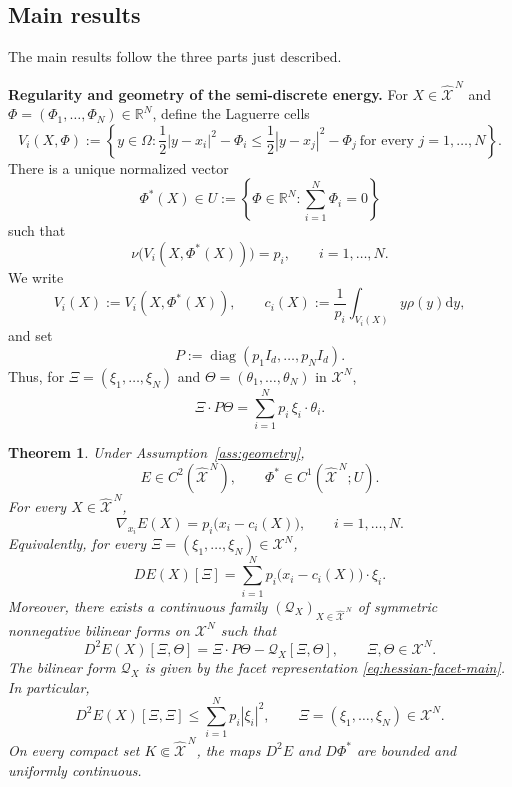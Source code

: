 \documentclass[11pt]{article}
\def\Xc{{\mathcal X}}
\def\hX{\widehat{\Xc}^{\,N}}
\newcommand{\dd}{\mathrm{d}}
\newtheorem{theorem}{Theorem}[section]
\theoremstyle{definition}
\theoremstyle{remark}
\numberwithin{equation}{section}
\begin{document}
\subsection{Main results}\label{subsec:main-results}

The main results follow the three parts just described.

\medskip

\noindent\textbf{Regularity and geometry of the semi-discrete energy.}
For $X\in\hX$ and $\Phi=(\Phi_1,\ldots,\Phi_N)\in\mathbb R^N$, define the Laguerre cells
\[
 V_i(X,\Phi)
 :=
 \left\{
 y\in\Omega:
 \frac12|y-x_i|^2-\Phi_i
 \le
 \frac12|y-x_j|^2-\Phi_j
 \ \text{for every }j=1,\ldots,N
 \right\}.
\]
There is a unique normalized vector
\[
 \Phi^*(X)\in
 U:=\left\{\Phi\in\mathbb R^N:\sum_{i=1}^N\Phi_i=0\right\}
\]
such that
\[
 \nu\bigl(V_i(X,\Phi^*(X))\bigr)=p_i,
 \qquad i=1,\ldots,N.
\]
We write
\[
 V_i(X):=V_i(X,\Phi^*(X)),
 \qquad
 c_i(X):=\frac1{p_i}\int_{V_i(X)}y\rho(y)\dd y,
\]
and set
\[
 P:=\operatorname{diag}(p_1I_d,\ldots,p_NI_d).
\]
Thus, for $\Xi=(\xi_1,\ldots,\xi_N)$ and
$\Theta=(\theta_1,\ldots,\theta_N)$ in $\Xc^N$,
\[
 \Xi\cdot P\Theta=\sum_{i=1}^Np_i\,\xi_i\cdot\theta_i.
\]

\begin{theorem}\label{thm:C2}
Under Assumption~\ref{ass:geometry},
\begin{equation}\label{eq:E-C2}
 E\in C^2(\hX),
 \qquad
 \Phi^*\in C^1(\hX;U).
\end{equation}
For every $X\in\hX$,
\begin{equation}\label{eq:DE-C2-theorem-main}
 \nabla_{x_i}E(X)=p_i\bigl(x_i-c_i(X)\bigr),
 \qquad i=1,\ldots,N.
\end{equation}
Equivalently, for every $\Xi=(\xi_1,\ldots,\xi_N)\in\Xc^N$,
\[
 DE(X)[\Xi]
 =\sum_{i=1}^Np_i\bigl(x_i-c_i(X)\bigr)\cdot\xi_i.
\]
Moreover, there exists a continuous family
$(\mathcal Q_X)_{X\in\hX}$ of symmetric nonnegative bilinear forms on $\Xc^N$ such that
\begin{equation}\label{eq:hessian-structural-main}
 D^2E(X)[\Xi,\Theta]
 =\Xi\cdot P\Theta-\mathcal Q_X[\Xi,\Theta],
 \qquad \Xi,\Theta\in\Xc^N.
\end{equation}
The bilinear form $\mathcal Q_X$ is given by the facet representation
\eqref{eq:hessian-facet-main}.  In particular,
\begin{equation}\label{eq:hessian-upper-P}
 D^2E(X)[\Xi,\Xi]
 \le\sum_{i=1}^Np_i|\xi_i|^2,
 \qquad \Xi=(\xi_1,\ldots,\xi_N)\in\Xc^N.
\end{equation}
On every compact set $K\Subset\hX$, the maps $D^2E$ and $D\Phi^*$ are bounded and uniformly
continuous.
\end{theorem}
\end{document}

